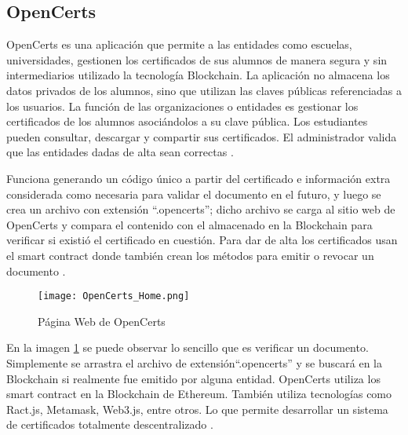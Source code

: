 \subsection{OpenCerts}
OpenCerts  es una aplicación que permite a las entidades como escuelas, universidades, gestionen los certificados de sus alumnos
de manera segura y sin intermediarios utilizado la tecnología  Blockchain.
La aplicación no almacena los datos privados de los alumnos, sino que utilizan las claves públicas referenciadas a los usuarios. La función de las organizaciones o entidades es gestionar los certificados de los alumnos 
asociándolos a su clave pública. Los estudiantes pueden consultar, descargar y compartir 
sus certificados. El administrador valida que las entidades dadas de alta sean correctas \cite[]{opencerts_gestion_nodate}.

Funciona generando 
un código único a partir del certificado e información extra considerada como necesaria para validar el documento en el futuro, y luego se crea 
un archivo con extensión  “.opencerts”;
dicho archivo se carga al sitio web de OpenCerts y compara el contenido con el almacenado en la  Blockchain para verificar si existió el 
certificado en cuestión.
Para dar de alta los certificados usan el smart contract donde también crean los métodos para emitir o revocar un documento \cite[]{opencerts_frequently_nodate}.

\begin{figure}[H]
  \centering
  {\texttt{[image: OpenCerts\_Home.png]}}
  \caption{Página Web de OpenCerts}
  \label{img:opencerts_home}
\end{figure}

En la imagen \ref{img:opencerts_home} se puede observar lo sencillo que es verificar un documento. Simplemente se arrastra el  archivo 
de extensión“.opencerts”
y se buscará en la  Blockchain si realmente fue emitido por alguna entidad.
OpenCerts utiliza los smart contract en la  Blockchain de Ethereum. También utiliza tecnologías como Ract.js, Metamask, Web3.js, entre otros. 
Lo que permite desarrollar
un sistema de certificados totalmente descentralizado \cite[]{opencerts_gestion_nodate}. 